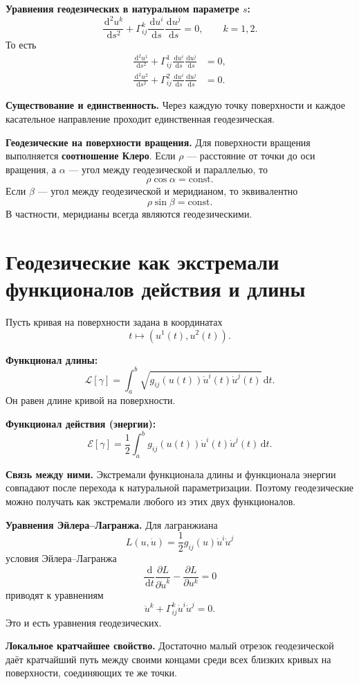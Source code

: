\documentclass[12pt,a4paper]{article}
\newcommand{\dd}{\,\mathrm{d}}
\begin{document}
\textbf{Уравнения геодезических в натуральном параметре $s$:}
\[
\frac{\dd^2u^k}{\dd s^2}
+
\Gamma^k_{ij}\frac{\dd u^i}{\dd s}\frac{\dd u^j}{\dd s}
=0,
\qquad k=1,2.
\]
То есть
\begin{align*}
\frac{\dd^2u^1}{\dd s^2}
+\Gamma^1_{ij}\frac{\dd u^i}{\dd s}\frac{\dd u^j}{\dd s}&=0,\\
\frac{\dd^2u^2}{\dd s^2}
+\Gamma^2_{ij}\frac{\dd u^i}{\dd s}\frac{\dd u^j}{\dd s}&=0.
\end{align*}

\textbf{Существование и единственность.}
Через каждую точку поверхности и каждое касательное направление проходит
единственная геодезическая.

\textbf{Геодезические на поверхности вращения.}
Для поверхности вращения выполняется \textbf{соотношение Клеро}.
Если $\rho$ --- расстояние от точки до оси вращения, а $\alpha$ --- угол
между геодезической и параллелью, то
\[
\rho\cos\alpha=\mathrm{const}.
\]
Если $\beta$ --- угол между геодезической и меридианом, то эквивалентно
\[
\rho\sin\beta=\mathrm{const}.
\]
В частности, меридианы всегда являются геодезическими.

\section{Геодезические как экстремали функционалов действия и длины}

Пусть кривая на поверхности задана в координатах
\[
t\mapsto (u^1(t),u^2(t)).
\]

\textbf{Функционал длины:}
\[
\mathcal{L}[\gamma]
=
\int_a^b
\sqrt{g_{ij}(u(t))\dot{u}^i(t)\dot{u}^j(t)}\dd t.
\]
Он равен длине кривой на поверхности.

\textbf{Функционал действия (энергии):}
\[
\mathcal{E}[\gamma]
=
\frac12\int_a^b g_{ij}(u(t))\dot{u}^i(t)\dot{u}^j(t)\dd t.
\]

\textbf{Связь между ними.}
Экстремали функционала длины и функционала энергии совпадают после
перехода к натуральной параметризации. Поэтому геодезические можно
получать как экстремали любого из этих двух функционалов.

\textbf{Уравнения Эйлера--Лагранжа.}
Для лагранжиана
\[
L(u,\dot{u})=\frac12 g_{ij}(u)\dot{u}^i\dot{u}^j
\]
условия Эйлера--Лагранжа
\[
\frac{\dd}{\dd t}\frac{\partial L}{\partial \dot{u}^k}
-\frac{\partial L}{\partial u^k}=0
\]
приводят к уравнениям
\[
\ddot{u}^k+\Gamma^k_{ij}\dot{u}^i\dot{u}^j=0.
\]
Это и есть уравнения геодезических.

\textbf{Локальное кратчайшее свойство.}
Достаточно малый отрезок геодезической даёт кратчайший путь между своими концами
среди всех близких кривых на поверхности, соединяющих те же точки.
\end{document}
